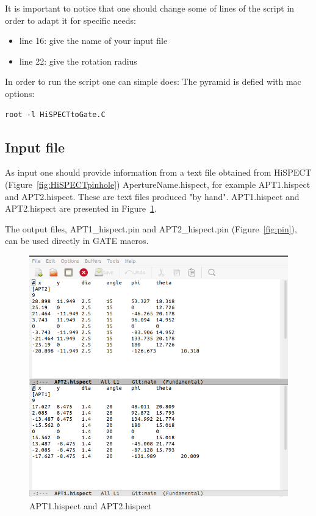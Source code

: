 \documentclass[12pt]{article}
\begin{document}
It is important to notice that one should change some of lines of the script in order to adapt it for specific needs:
\begin{itemize}
\item line 16: give the name of your input file
\item line 22: give the rotation radius
\end{itemize}

In order to run the script one can simple does: 
The pyramid is defied with mac options:  
\begin{verbatim}
root -l HiSPECTtoGate.C
\end{verbatim}

\subsection{Input file}
As input one should provide information from a text file obtained from HiSPECT (Figure~\ref{fig:HiSPECTpinhole}) ApertureName.hispect, for example APT1.hispect and APT2.hispect. These are text files produced "by hand". APT1.hispect and APT2.hispect are presented in Figure~\ref{fig:hispect}. 

The output files, APT1\_hispect.pin and APT2\_hispect.pin (Figure~\ref{fig:pin}), can be used directly in GATE macros.

\begin{figure}[htp]
\centering
\includegraphics[scale=0.45]{figs/hispect.png}
\caption{APT1.hispect and APT2.hispect}
\label{fig:hispect}
\end{figure}
\end{document}
